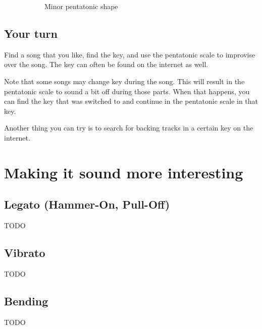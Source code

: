 \begin{figure}[h]
\begin{subfigure}[b]{0.45\textwidth}
		\caption{Minor pentatonic shape}
		\label{fig:guitar_minor_pentatonic_shape}
	\end{subfigure}
	\caption{}
	\label{fig:guitar_major_minor_pentatonic_shapes}
\end{figure}

\subsection{Your turn}

Find a song that you like, find the key, and use the pentatonic scale to improvise over the song. The key can often be found on the internet as well.

Note that some songs may change key during the song. This will result in the pentatonic scale to sound a bit off during those parts. When that happens, you can find the key that was switched to and continue in the pentatonic scale in that key.

Another thing you can try is to search for backing tracks in a certain key on the internet.

\newpage

\section{Making it sound more interesting}

\subsection{Legato (Hammer-On, Pull-Off)}
TODO

\subsection{Vibrato}
TODO

\subsection{Bending}
TODO
